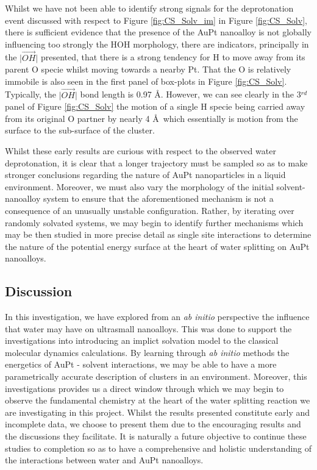 Whilst we have not been able to identify strong signals for the deprotonation event discussed with respect to Figure \ref{fig:CS_Solv_im} in Figure \ref{fig:CS_Solv}, there is sufficient evidence that the presence of the AuPt nanoalloy is not globally influencing too strongly the HOH morphology, there are indicators, principally in the $\vert\overrightarrow{OH}\vert$ presented, that there is a strong tendency for H to move away from its parent O specie whilst moving towards a nearby Pt. That the O is relatively immobile is also seen in the first panel of box-plots in Figure \ref{fig:CS_Solv}. Typically, the $\vert\overrightarrow{OH}\vert$ bond length is 0.97 \AA. However, we can see clearly in the 3$^{rd}$ panel of Figure \ref{fig:CS_Solv} the motion of a single H specie being carried away from its original O partner by nearly 4 \AA \ which essentially is motion from the surface to the sub-surface of the cluster.

Whilst these early results are curious with respect to the observed water deprotonation, it is clear that a longer trajectory must be sampled so as to make stronger conclusions regarding the nature of AuPt nanoparticles in a liquid environment. Moreover, we must also vary the morphology of the initial solvent-nanoalloy system to ensure that the aforementioned mechanism is not a consequence of an unusually unstable configuration. Rather, by iterating over randomly solvated systems, we may begin to identify further mechanisms which may be then studied in more precise detail as single site interactions to determine the nature of the potential energy surface at the heart of water splitting on AuPt nanoalloys.

\subsection{Discussion}

In this investigation, we have explored from an \textit{ab initio} perspective the influence that water may have on ultrasmall nanoalloys. This was done to support the investigations into introducing an implict solvation model to the classical molecular dynamics calculations. By learning through \textit{ab initio} methods the energetics of AuPt - solvent interactions, we may be able to have a more parametrically accurate description of clusters in an environment. Moreover, this investigations provides us a direct window through which we may begin to observe the fundamental chemistry at the heart of the water splitting reaction we are investigating in this project. Whilst the results presented constitute early and incomplete data, we choose to present them due to the encouraging results and the discussions they facilitate. It is naturally a future objective to continue these studies to completion so as to have a comprehensive and holistic understanding of the interactions between water and AuPt nanoalloys.

